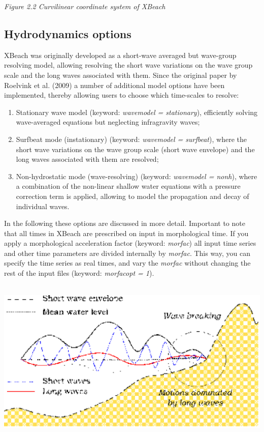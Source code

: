 \documentclass{article}
\begin{document}
\noindent \textit{Figure 2.2 Curvilinear coordinate system of XBeach}


\subsection{ Hydrodynamics options}

\noindent XBeach was originally developed as a short-wave averaged but wave-group resolving model, allowing resolving the short wave variations on the wave group scale and the long waves associated with them. Since the original paper by Roelvink et al. (2009) a number of additional model options have been implemented, thereby allowing users to choose which time-scales to resolve:

\begin{enumerate}
\item  Stationary wave model (keyword: \textit{wavemodel = stationary}), efficiently solving wave-averaged equations but neglecting infragravity waves;

\item  Surfbeat mode (instationary) (keyword: \textit{wavemodel = surfbeat}), where the short wave variations on the wave group scale (short wave envelope) and the long waves associated with them are resolved;

\item  Non-hydrostatic mode (wave-resolving) (keyword: \textit{wavemodel = nonh}), where a combination of the non-linear shallow water equations with a pressure correction term is applied, allowing to model the propagation and decay of individual waves.
\end{enumerate}

\noindent 

\noindent In the following these options are discussed in more detail. Important to note that all times in XBeach are prescribed on input in morphological time. If you apply a morphological acceleration factor (keyword: \textit{morfac}) all input time series and other time parameters are divided internally by \textit{morfac}. This way, you can specify the time series as real times, and vary the \textit{morfac} without changing the rest of the input files (keyword: \textit{morfacopt = 1}).

\noindent 

\noindent \includegraphics*[width=6.04in, height=3.12in, keepaspectratio=false]{image10}
\end{document}
